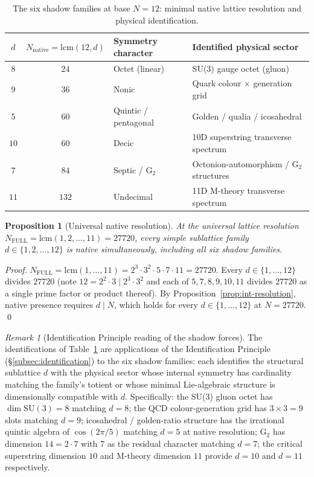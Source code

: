 \documentclass[11pt,a4paper]{article}
\newtheorem{proposition}[theorem]{Proposition}
\theoremstyle{definition}
\theoremstyle{remark}
\newtheorem{remark}[theorem]{Remark}
\begin{document}
\begin{table}[ht]
\centering
\begin{tabular}{c|c|l|l}
\toprule
$d$ & $N_{\text{native}} = \mathrm{lcm}(12,d)$ & Symmetry character & Identified physical sector \\ \midrule
$8$  & $24$  & Octet (linear) & SU(3) gauge octet (gluon) \\
$9$  & $36$  & Nonic & Quark colour $\times$ generation grid \\
$5$  & $60$  & Quintic / pentagonal & Golden / qualia / icosahedral \\
$10$ & $60$  & Decic & 10D superstring transverse spectrum \\
$7$  & $84$  & Septic / G$_{2}$ & Octonion-automorphism / G$_{2}$ structures \\
$11$ & $132$ & Undecimal & 11D M-theory transverse spectrum \\ \bottomrule
\end{tabular}
\caption{The six shadow families at base $N=12$: minimal native lattice resolution and physical identification.}\label{tab:shadow-forces}
\end{table}

\begin{proposition}[Universal native resolution]\label{prop:universal-native}
At the universal lattice resolution $N_{\mathrm{FULL}} = \mathrm{lcm}(1,2,\ldots,11) = 27720$, every simple sublattice family $d \in \{1,2,\ldots,12\}$ is native simultaneously, including all six shadow families.
\end{proposition}

\begin{proof}
$N_{\mathrm{FULL}} = \mathrm{lcm}(1,\ldots,11) = 2^{3}\cdot 3^{2}\cdot 5\cdot 7\cdot 11 = 27720$. Every $d\in\{1,\ldots,12\}$ divides $27720$ (note $12 = 2^{2}\cdot 3 \mid 2^{3}\cdot 3^{2}$ and each of $5,7,8,9,10,11$ divides $27720$ as a single prime factor or product thereof). By Proposition~\ref{prop:int-resolution}, native presence requires $d\mid N$, which holds for every $d\in\{1,\ldots,12\}$ at $N=27720$. \qed
\end{proof}

\begin{remark}[Identification Principle reading of the shadow forces]\label{rem:shadow-identification}
The identifications of Table~\ref{tab:shadow-forces} are applications of the Identification Principle (\S\ref{subsec:identification}) to the six shadow families: each identifies the structural sublattice $d$ with the physical sector whose internal symmetry has cardinality matching the family's totient or whose minimal Lie-algebraic structure is dimensionally compatible with $d$. Specifically: the SU(3) gluon octet has $\dim\mathrm{SU}(3)=8$ matching $d=8$; the QCD colour-generation grid has $3\times 3 = 9$ slots matching $d=9$; icosahedral / golden-ratio structure has the irrational quintic algebra of $\cos(2\pi/5)$ matching $d=5$ at native resolution; G$_{2}$ has dimension $14 = 2\cdot 7$ with $7$ as the residual character matching $d=7$; the critical superstring dimension $10$ and M-theory dimension $11$ provide $d=10$ and $d=11$ respectively.
\end{remark}
\end{document}
